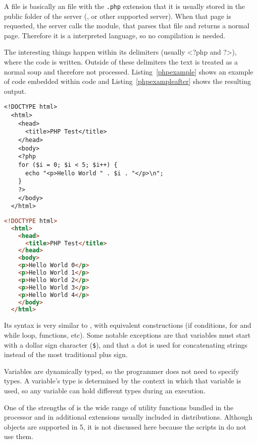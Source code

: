 A  file is basically an  file with the \texttt{.php} extension that it is usually stored in the public folder of the server (,  or other supported server).
When that page is requested, the server calls the  module, that parses that file and returns a normal  page.
Therefore it is a interpreted language, so no compilation is needed.

The interesting things happen within its delimiters
(usually <?php and ?>), where the  code is written.
Outside of these delimiters the text is treated as a normal  soup and therefore not processed.
Listing~\ref{phpexample} shows an example of  code embedded within  code and Listing~\ref{phpexampleafter} shows the resulting  output.

\begin{lstlisting}[float=htbp,label=phpexample,language={[phpoo]php},alsolanguage=html,caption=\idx{PHP} code embedded within \idx{HTML} code] % java
  <!DOCTYPE html>
  <html>
    <head>
      <title>PHP Test</title>
    </head>
    <body>
    <?php
    for ($i = 0; $i < 5; $i++) {
      echo "<p>Hello World " . $i . "</p>\n";
    }
    ?>
    </body>
  </html>
\end{lstlisting}

\begin{lstlisting}[float=htbp,label=phpexampleafter,language=html,caption=Resulting \idx{HTML} code]
  <!DOCTYPE html>
  <html>
    <head>
      <title>PHP Test</title>
    </head>
    <body>
    <p>Hello World 0</p>
    <p>Hello World 1</p>
    <p>Hello World 2</p>
    <p>Hello World 3</p>
    <p>Hello World 4</p>
    </body>
  </html>
\end{lstlisting}

Its syntax is very similar to , with equivalent constructions (if conditions, for and while loop, functions, etc).
Some notable exceptions are that variables must start with a dollar sign character (\texttt{\$}), and that a dot is used for concatenating strings instead of the most traditional plus sign.

Variables are dynamically typed, so the programmer does not need to specify types. A variable's type is determined by the context in which that variable is used, so any variable can hold different types during an execution.

One of the strengths of  is the wide range of utility functions bundled in the processor and in additional extensions usually included in distributions.
Although objects are supported in  5, it is not discussed here because the scripts in  do not use them.

